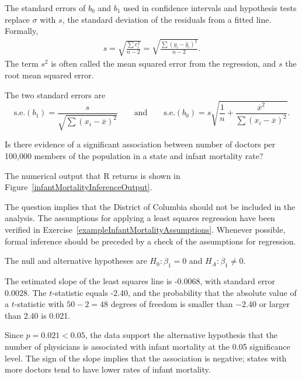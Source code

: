 The standard errors of $b_0$ and $b_1$ used in confidence intervals and hypothesis tests replace $\sigma$ with $s$, the standard deviation of the residuals from a fitted line. Formally, 
\begin{align}
 s = \sqrt{\frac{\sum e^{2}_{i}}{n-2}} =  \sqrt{\frac{\sum (y_{i}-\hat{y}_{i})^{2}}{n-2}}.
  \label{equation:regressionMSE}
\end{align}
The term $s^2$ is often called the mean squared error from the regression, and $s$ the root mean squared error. 

The two standard errors are
\[\text{s.e.}(b_1) = \frac{s}{\sqrt{\sum(x_i -\overline{x})^2}}  \qquad \text{and} \qquad \text{s.e.}(b_0) = s \sqrt{\frac{1}{n} + \frac{\overline{x}^2}
	{\sum(x_i - \overline{x})^2}}. \]


\begin{examplewrap}
\begin{nexample}{Is there evidence of a significant association between number of doctors per 100,000 members of the population in a state and infant mortality rate? 
		
The numerical output that \textsf{R} returns is shown in Figure~\ref{infantMortalityInferenceOutput}.\footnotemark{}}\label{exampleInfantMortalityInference}%
The question implies that the District of Columbia should not be included in the analysis. The assumptions for applying a least squares regression have been verified in Exercise~\ref{exampleInfantMortalityAssumptions}. Whenever possible, formal inference should be preceded by a check of the assumptions for regression.

The null and alternative hypotheses are $H_0:\beta_1 = 0$ and $H_A:\beta_1 \neq 0.$	

The estimated slope of the least squares line is -0.0068, with standard error 0.0028. The $t$-statistic equals -2.40, and the probability that the absolute value of a $t$-statistic with $50-2=48$ degrees of freedom is smaller than $-2.40$ or larger than $2.40$ is 0.021. 

Since $p = 0.021 < 0.05$, the data support the alternative hypothesis that the number of physicians is associated with infant mortality at the 0.05 significance level. The sign of the slope implies that the association is negative; states with more doctors tend to have lower rates of infant mortality.
\end{nexample}
\end{examplewrap}

